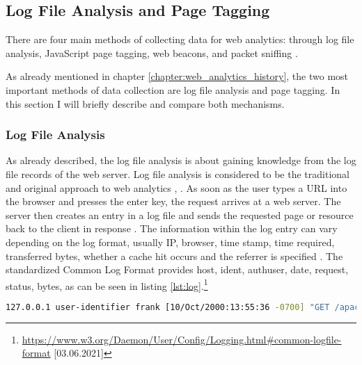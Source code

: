 


\subsection{Log File Analysis and Page Tagging}
\label{chapter:web_analytics_logfile_pagetagging}

There are four main methods of collecting data for web analytics: through log file analysis, JavaScript page tagging, web beacons, and packet sniffing \cite{2009Waisberg}.

As already mentioned in chapter \ref{chapter:web_analytics_history},  the two most important methods of data collection are log file analysis and page tagging.
In this section I will briefly describe and compare both mechanisms.



\subsubsection{Log File Analysis}
\label{chapter:log_file}


As already described, the log file analysis is about gaining knowledge from the log file records of the web server.
Log file analysis is considered to be the traditional and original approach to web analytics \cite{2011Marek}, \cite{2015Zheng}. %
As soon as the user types a URL into the browser and presses the enter key, the request arrives at a web server.
The server then creates an entry in a log file and sends the requested page or resource back to the client in response \cite{2009Waisberg}.
The information within the log entry can vary depending on the log format, usually IP, browser, time stamp, time required, transferred bytes, whether a cache hit occurs and the referrer is specified \cite{2009Waisberg}.
The standardized Common Log Format provides host, ident, authuser, date, request, status, bytes, as can be seen in listing \ref{lst:log}.\footnote{\url{https://www.w3.org/Daemon/User/Config/Logging.html\#common-logfile-format} [03.06.2021]}

\begin{center}
\begin{lstlisting}[caption={CLF}, language=bash, numbers=none, basicstyle=\tiny, label={lst:log}]
127.0.0.1 user-identifier frank [10/Oct/2000:13:55:36 -0700] "GET /apache_pb.gif HTTP/1.0" 200 2326
\end{lstlisting}
\end{center}

